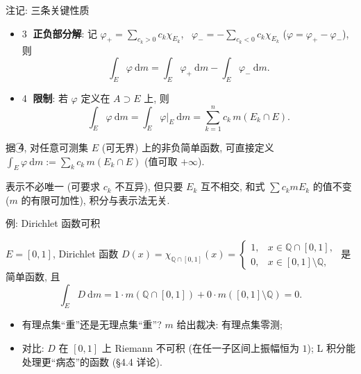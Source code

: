 \begin{frame}{注记: 三条关键性质}

\begin{itemize}
\item \textcircled{3} \textbf{正负部分解}: 记
$\varphi_+ = \sum_{c_k > 0} c_k \chi_{E_k}$, \
$\varphi_- = - \sum_{c_k < 0} c_k \chi_{E_k}$ ($\varphi = \varphi_+ - \varphi_-$),
则
\[
\int_E \varphi ~ \mathrm{d} m = \int_E \varphi_+ ~ \mathrm{d} m - \int_E \varphi_- ~ \mathrm{d} m .
\]

\pause

\item \textcircled{4} \textbf{限制}: 若 $\varphi$ 定义在 $A \supset E$ 上, 则
\[
\int_E \varphi ~ \mathrm{d} m
= \int_E \varphi \big|_E ~ \mathrm{d} m
= \sum_{k=1}^{n} c_k\, m(E_k \cap E) .
\]
\end{itemize}

\pause

\begin{attnblock}
据 \textcircled{4}, 对\alert{任意}可测集 $E$ (可无界) 上的\alert{非负}简单函数, 可直接定义
$\int_E \varphi ~ \mathrm{d} m := \sum_k c_k\, m(E_k \cap E)$ (值可取 $+\infty$).
\end{attnblock}

\pause

\begin{attnblock}[良定性]
表示不必唯一 (可要求 $c_k$ 不互异), 但只要 $E_k$ 互不相交,
和式 $\sum c_k m E_k$ 的值不变 ($m$ 的有限可加性), 积分与表示法无关.
\end{attnblock}

\end{frame}


\begin{frame}{例: Dirichlet 函数可积}

\begin{eg}
$E = [0,1]$, Dirichlet 函数
$D(x) = \chi_{\mathbb{Q} \cap [0,1]}(x)
= \begin{cases} 1, & x \in \mathbb{Q} \cap [0,1], \\ 0, & x \in [0,1] \setminus \mathbb{Q}, \end{cases}$
是简单函数, 且
\[
\int_E D ~ \mathrm{d} m
= 1 \cdot m(\mathbb{Q} \cap [0,1]) + 0 \cdot m([0,1] \setminus \mathbb{Q})
= 0 .
\]
\end{eg}

\pause

\begin{itemize}
\item 有理点集``重''还是无理点集``重''? $m$ 给出裁决: 有理点集\alert{零测};
\graymode
\item 对比: $D$ 在 $[0,1]$ 上 \alert{Riemann 不可积} (在任一子区间上振幅恒为 $1$);
  L 积分能处理更``病态''的函数 (§4.4 详论).
\normalmode
\end{itemize}

\end{frame}

